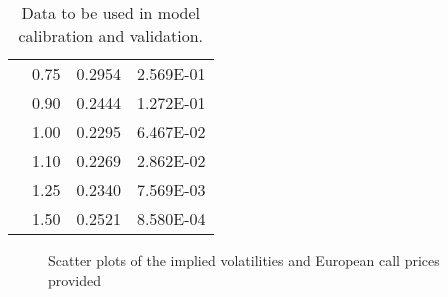 \begin{table}[!htb]
\begin{adjustwidth}{-0.25cm}{-0.25cm}
\begin{subfigmatrix}{2}
{\begin{tabular}{@{}cccc@{}}
 & 0.75 & 0.2954 & \num{2.569E-01} \\
 & 0.90 & 0.2444 & \num{1.272E-01} \\
 & 1.00 & 0.2295 & \num{6.467E-02} \\
 & 1.10 & 0.2269 & \num{2.862E-02} \\
 & 1.25 & 0.2340 & \num{7.569E-03} \\
 & 1.50 & 0.2521 & \num{8.580E-04} \\ \bottomrule
\end{tabular}
}
  \end{subfigmatrix}
  \caption[Data to be used in model calibration and validation.]{Data to be used in model calibration and validation.}
  \label{tab:mktdata}
  \end{adjustwidth}
\end{table}



\begin{figure}[!htb]
  \begin{subfigmatrix}{2}
  \end{subfigmatrix}
  \caption[Scatter plots of the implied volatilities and European call prices provided]{Scatter plots of the implied volatilities and European call prices provided}
  \label{fig:mktdata}
\end{figure}


